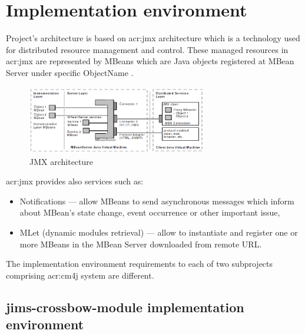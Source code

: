 \documentclass[11pt,openany]{book}
\begin{document}
    \section{Implementation environment}
    \label{sec:impl:env}

      Project's architecture is based on \gls{acr:jmx} architecture which is a technology used for distributed resource
      management and control. These managed resources in \gls{acr:jmx} are represented by MBeans which are Java objects
      registered at MBean Server under specific ObjectName \cite{jims}.

      \begin{figure}[h]
        \begin{center}
          \includegraphics[width=0.7\textwidth]{img/jims/jmx.png}
        \end{center}

        \caption{JMX architecture \cite{jims}}
      \end{figure}

      \gls{acr:jmx} provides also services such as:

      \begin{itemize}
        \item Notifications --- allow MBeans to send asynchronous messages which inform about MBean's state change,
                                event occurrence or other important issue,
        \item MLet (dynamic modules retrieval) --- allow to instantiate and register one or more MBeans in the MBean
                                                   Server downloaded from remote URL.
      \end{itemize}

      The implementation environment requirements to each of two subprojects comprising \gls{acr:cm4j} system are
      different.

	
      \subsection{jims-crossbow-module implementation environment}
\end{document}
